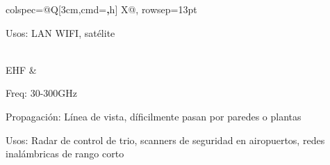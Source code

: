 \documentclass[letterpaper]{article}
\begin{document}
\begin{longtblr}{
    colspec={@{}Q[3cm,cmd=\textbf,h] X@{}},
    rowsep={13pt}
  }
\begin{minipage}{\linewidth}
    Usos: LAN WIFI, satélite
        
	\end{minipage}
  \\
  EHF
  & \begin{minipage}{\linewidth}
    Freq: 30-300GHz
    \medskip

    Propagación: Línea de vista, díficilmente pasan por paredes o plantas

    \medskip
    Usos: Radar de control de trio, scanners de seguridad en airopuertos, redes inalámbricas de rango corto
	\end{minipage}

\end{longtblr}
\end{document}
